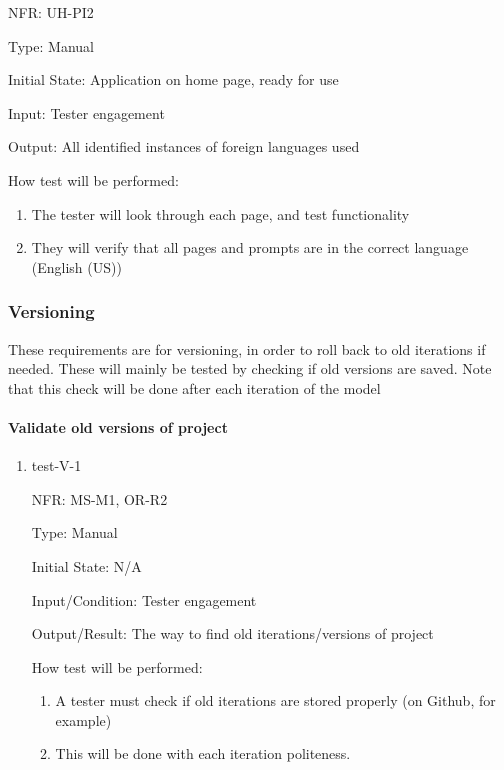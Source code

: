 \documentclass[12pt, titlepage]{article}
\begin{document}
\begin{enumerate}
  NFR: UH-PI2

  Type: Manual
            
  Initial State: Application on home page, ready for use
            
  Input: Tester engagement
            
  Output: All identified instances of foreign languages used
            
  How test will be performed: 
  \begin{enumerate}
    \item The tester will look through each page, and test functionality
    \item They will verify that all pages and prompts are in the correct language (English (US))
  \end{enumerate}
  
  \end{enumerate}

\subsubsection{Versioning}
These requirements are for versioning, in order to roll back to old iterations
if needed. These will mainly be tested by checking if old versions are saved.
Note that this check will be done after each iteration of the model

\paragraph{Validate old versions of project}
\begin{enumerate}
  \item{test-V-1}

  NFR: MS-M1, OR-R2
  
  Type: Manual
            
  Initial State: N/A
            
  Input/Condition: Tester engagement
            
  Output/Result: The way to find old iterations/versions of project
            
  How test will be performed: 
  \begin{enumerate}
    \item A tester must check if old iterations are stored properly (on Github, for example)
    \item This will be done with each iteration
    politeness.
  \end{enumerate}
\end{enumerate}
\end{document}
